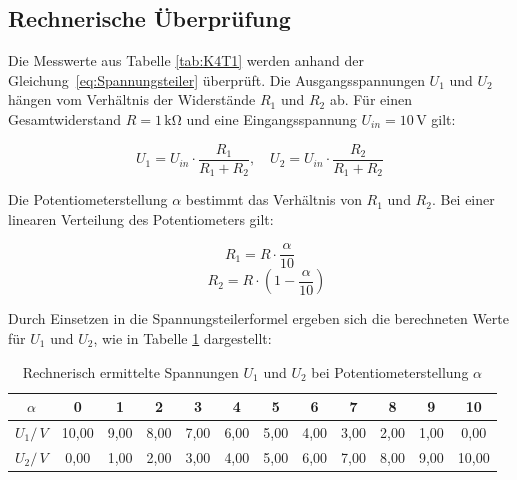 \newpage

\subsection{Rechnerische Überprüfung}

Die Messwerte aus Tabelle \ref{tab:K4T1} werden anhand der Gleichung~\eqref{eq:Spannungsteiler} überprüft. Die Ausgangsspannungen $U_1$ und $U_2$ hängen vom Verhältnis der Widerstände $R_1$ und $R_2$ ab. Für einen Gesamtwiderstand $R = 1\,\mathrm{k\Omega}$ und eine Eingangsspannung $U_{in} = 10\,\mathrm{V}$ gilt:

\[
U_1 = U_{in} \cdot \frac{R_1}{R_1 + R_2}, \quad U_2 = U_{in} \cdot \frac{R_2}{R_1 + R_2}
\]

Die Potentiometerstellung $\alpha$ bestimmt das Verhältnis von $R_1$ und $R_2$. Bei einer linearen Verteilung des Potentiometers gilt:

\begin{equation}
    R_1 = R \cdot \frac{\alpha}{10}
\end{equation}
\begin{equation}
    \quad R_2 = R \cdot \left( 1 - \frac{\alpha}{10} \right)
\end{equation}

Durch Einsetzen in die Spannungsteilerformel ergeben sich die berechneten Werte für $U_1$ und $U_2$, wie in Tabelle \ref{tab:K4T2} dargestellt:

\begin{table}[H]
\centering
\caption{Rechnerisch ermittelte Spannungen $U_1$ und $U_2$ bei Potentiometerstellung $\alpha$}
\begin{tabular}{c c c c c c c c c c c c}
\toprule
$\alpha$ & 0 & 1 & 2 & 3 & 4 & 5 & 6 & 7 & 8 & 9 & 10 \\
\midrule
$U_1/\,\unit{V}$ & 10,00 & 9,00 & 8,00 & 7,00 & 6,00 & 5,00 & 4,00 & 3,00 & 2,00 & 1,00 & 0,00 \\
$U_2/\,\unit{V}$ & 0,00 & 1,00 & 2,00 & 3,00 & 4,00 & 5,00 & 6,00 & 7,00 & 8,00 & 9,00 & 10,00 \\
\bottomrule
\end{tabular}
\label{tab:K4T2}
\end{table}

\newpage
